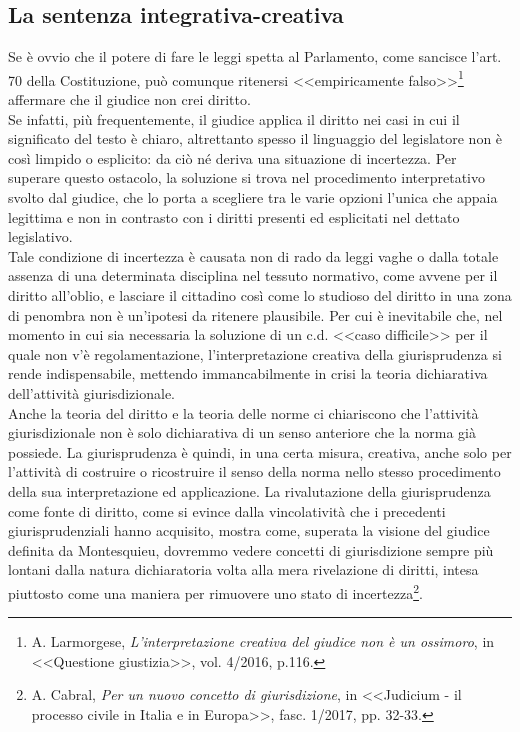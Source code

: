 \subsection{La sentenza integrativa-creativa}
Se è ovvio che il potere di fare le leggi spetta al Parlamento, come sancisce l'art. 70 della Costituzione, può comunque ritenersi <<empiricamente falso>>\footnote{A. Larmorgese, \textit{L’interpretazione creativa del giudice non è un ossimoro}, in <<Questione giustizia>>, vol. 4/2016, p.116.} affermare che il giudice non crei diritto.
\\Se infatti, più frequentemente, il giudice applica il diritto nei casi in cui il significato del testo è chiaro, altrettanto spesso il linguaggio del legislatore non è così limpido o esplicito: da ciò né deriva una situazione di incertezza.
Per superare questo ostacolo, la soluzione si trova nel procedimento interpretativo svolto dal giudice, che lo porta a scegliere tra le varie opzioni l’unica che appaia legittima e non in contrasto con i diritti presenti ed esplicitati nel dettato legislativo. 
\\Tale condizione di incertezza è causata non di rado da leggi vaghe o dalla totale assenza di una determinata disciplina nel tessuto normativo, come avvene per il diritto all’oblio, e lasciare il cittadino così come lo studioso del diritto in una zona di penombra non è un'ipotesi da ritenere plausibile.
Per cui è inevitabile che, nel momento in cui sia necessaria la soluzione di un c.d. <<caso difficile>> per il quale non v'è regolamentazione, l'interpretazione creativa della giurisprudenza si rende indispensabile, mettendo immancabilmente in crisi la teoria dichiarativa dell’attività giurisdizionale.
\\Anche la teoria del diritto e la teoria delle norme ci chiariscono che l’attività giurisdizionale non è solo dichiarativa di un senso anteriore che la norma già possiede. La giurisprudenza è quindi, in una certa misura, creativa, anche solo per l'attività di costruire o ricostruire il senso della norma nello stesso procedimento della sua interpretazione ed applicazione. La rivalutazione della giurisprudenza come fonte di diritto, come si evince dalla vincolatività che i precedenti giurisprudenziali hanno acquisito, mostra come, superata la visione del giudice definita da Montesquieu, dovremmo vedere concetti di giurisdizione sempre più lontani dalla natura dichiaratoria volta alla mera rivelazione di diritti, intesa piuttosto come una maniera per rimuovere uno stato di incertezza\footnote{A. Cabral, \textit{Per un nuovo concetto di giurisdizione}, in <<Judicium - il processo civile in Italia e in Europa>>, fasc. 1/2017, pp. 32-33.}.


